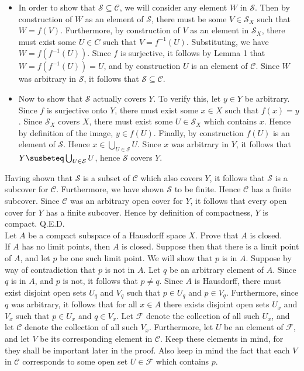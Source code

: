 \documentclass{article}
\newcommand{\inv}[1]{#1^{-1}}
\newcommand{\inv}[1]{#1^{-1}}
\begin{document}
\begin{itemize}
    \item In order to show that $\mathcal{S}\subseteq \mathcal{C}$, we will consider any element $W$ in $\mathcal{S}$. Then by construction of $W$ as an element of $\mathcal{S}$, there must be some $V\in \mathcal{S}_X$ such that $W = f(V)$. Furthermore, by construction of $V$ as an element in $\mathcal{S}_X$, there must exist some $U\in C$ such that $V = \inv{f}(U)$. Substituting, we have $W = f(\inv{f}(U))$. Since $f$ is surjective, it follows by Lemma 1 that $ W = f(\inv{f}(U)) = U$, and by construction $U$ is an element of $\mathcal{C}$. Since $W$ was arbitrary in $\mathcal{S}$, it follows that $\mathcal{S}\subseteq \mathcal{C}$.
    
    \item Now to show that $\mathcal{S}$ actually covers $Y$. To verify this, let $y\in Y$ be arbitrary. Since $f$ is surjective onto $Y$, there must exist some $x\in X$ such that $f(x) = y$. Since $\mathcal{S}_X$ covers $X$, there must exist some $U\in \mathcal{S}_X$ which contains $x$. Hence by definition of the image, $y\in f(U)$. Finally, by construction $f(U)$ is an element of $\mathcal{S}$. Hence $x\in \bigcup_{U\in \mathcal{S}}U$. Since $x$ was arbitrary in $Y$, it follows that $Y\susbeteq \bigcup_{U\in \mathcal{S}}U$, hence $\mathcal{S}$ covers $Y$. 
\end{itemize}

Having shown that $\mathcal{S}$ is a subset of $\mathcal{C}$ which also covers $Y$, it follows that $\mathcal{S}$ is a subcover for $\mathcal{C}$. Furthermore, we have shown $\mathcal{S}$ to be finite. Hence $\mathcal{C}$ has a finite subcover. Since $\mathcal{C}$ was an arbitrary open cover for $Y$, it follows that every open cover for $Y$ has a finite subcover. Hence by definition of compactness, $Y$ is compact. Q.E.D.\\



 Let $A$ be a compact subspace of a Hausdorff space $X$.  Prove that $A$ is closed.\\
If $A$ has no limit points, then $A$ is closed. Suppose then that there is a limit point of $A$, and let $p$ be one such limit point. We will show that $p$ is in $A$. Suppose by way of contradiction that $p$ is not in $A$. Let $q$ be an arbitrary element of $A$. Since $q$ is in $A$, and $p$ is not, it follows that $p\ne q$. Since $A$ is Hausdorff, there must exist disjoint open sets $U_q$ and $V_q$ such that $p\in U_q$ and $p\in V_q$. Furthermore, since $q$ was arbitrary, it follows that for all $x\in A$ there exists disjoint open sets $U_x$ and $V_x$ such that $p\in U_x$ and $q\in V_x$. Let $\mathcal{F}$ denote the collection of all such $U_x$, and let $\mathcal{C}$ denote the collection of all such $V_x$. Furthermore, let $U$ be an element of $\mathcal{F}$, and let $V$ be its corresponding element in $\mathcal{C}$. Keep these elements in mind, for they shall be important later in the proof. Also keep in mind the fact that each $V$ in $\mathcal{C}$ corresponds to some open set $U\in \mathcal{F}$ which contains $p$. \\
\end{document}
